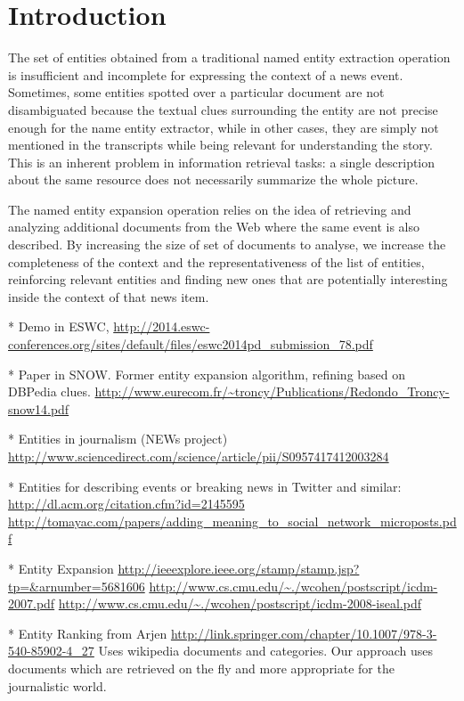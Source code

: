 \documentclass{llncs}
\begin{document}
\section{Introduction}


The set of entities obtained from a traditional named entity extraction operation is insufficient and incomplete for expressing the context of a news event. Sometimes, some entities spotted over a particular document are not disambiguated because the textual clues surrounding the entity are not precise enough for the name entity extractor, while in other cases, they are simply not mentioned in the transcripts while being relevant for understanding the story. This is an inherent problem in information retrieval tasks: a single description about the same resource does not necessarily summarize the whole picture.

The named entity expansion operation relies on the idea of retrieving and analyzing additional documents from the Web where the same event is also described. By increasing the size of set of documents to analyse, we increase the completeness of the context and the representativeness of the list of entities, reinforcing relevant entities and finding new ones that are potentially interesting inside the context of that news item.

* Demo in ESWC, 
\url{http://2014.eswc-conferences.org/sites/default/files/eswc2014pd_submission_78.pdf}

* Paper in SNOW. Former entity expansion algorithm, refining based on DBPedia clues.
\url{http://www.eurecom.fr/~troncy/Publications/Redondo_Troncy-snow14.pdf}

* Entities in journalism (NEWs project)
\url{http://www.sciencedirect.com/science/article/pii/S0957417412003284}

* Entities for describing events or breaking news in Twitter and similar:
\url{http://dl.acm.org/citation.cfm?id=2145595}
\url{http://tomayac.com/papers/adding_meaning_to_social_network_microposts.pdf}

* Entity Expansion 
\url{http://ieeexplore.ieee.org/stamp/stamp.jsp?tp=&arnumber=5681606}
\url{http://www.cs.cmu.edu/~./wcohen/postscript/icdm-2007.pdf}
\url{http://www.cs.cmu.edu/~./wcohen/postscript/icdm-2008-iseal.pdf}

* Entity Ranking from Arjen
\url{http://link.springer.com/chapter/10.1007/978-3-540-85902-4_27}
Uses wikipedia documents and categories. Our approach uses documents which are retrieved on the fly and more appropriate for the journalistic world.
\end{document}

